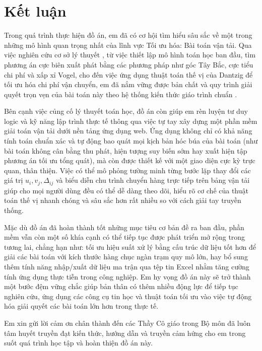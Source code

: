 \documentclass[../main.tex]{subfiles}
\begin{document}
\chapter*{Kết luận}

Trong quá trình thực hiện đồ án, em đã có cơ hội tìm hiểu sâu sắc về một trong những mô hình quan trọng nhất của lĩnh vực Tối ưu hóa: Bài toán vận tải. Qua việc nghiên cứu cơ sở lý thuyết \cite{hitchcock1941, koopmans1949}, từ việc thiết lập mô hình toán học ban đầu, tìm phương án cực biên xuất phát bằng các phương pháp như góc Tây Bắc, cực tiểu chi phí và xấp xỉ Vogel, cho đến việc ứng dụng thuật toán thế vị của Dantzig \cite{dantzig1951} để tối ưu hóa chi phí vận chuyển, em đã nắm vững được bản chất và quy trình giải quyết trọn vẹn của bài toán này theo hệ thống kiến thức giáo trình chuẩn \cite{bachkim}.

Bên cạnh việc củng cố lý thuyết toán học, đồ án còn giúp em rèn luyện tư duy logic và kỹ năng lập trình thực tế thông qua việc tự tay xây dựng một phần mềm giải toán vận tải dưới nền tảng ứng dụng web. Ứng dụng không chỉ có khả năng tính toán chuẩn xác và tự động bao quát mọi kịch bản hóc búa của bài toán (như bài toán không cân bằng thu phát, hiện tượng suy biến sớm hay xuất hiện tập phương án tối ưu tổng quát), mà còn được thiết kế với một giao diện cực kỳ trực quan, thân thiện. Việc có thể mô phỏng tường minh từng bước lặp thay đổi các giá trị $u_i, v_j, \Delta_{ij}$ và biểu diễn chu trình chuyển hàng trực tiếp trên bảng vận tải giúp cho mọi người dùng đều có thể dễ dàng theo dõi, hiểu rõ cơ chế của thuật toán thế vị nhanh chóng và sâu sắc hơn rất nhiều so với cách giải tay truyền thống.

Mặc dù đồ án đã hoàn thành tốt những mục tiêu cơ bản đề ra ban đầu, phần mềm vẫn còn một số khía cạnh có thể tiếp tục được phát triển mở rộng trong tương lai, chẳng hạn như: tối ưu hiệu suất xử lý bằng cấu trúc dữ liệu tốt hơn để giải các bài toán với kích thước hàng chục ngàn trạm quy mô lớn, hay bổ sung thêm tính năng nhập/xuất dữ liệu ma trận qua tệp tin Excel nhằm tăng cường tính ứng dụng thực tiễn trong công nghiệp. Em hy vọng đồ án này sẽ trở thành một bước đệm vững chắc giúp bản thân có thêm nhiều động lực để tiếp tục nghiên cứu, ứng dụng các công cụ tin học và thuật toán tối ưu vào việc tự động hóa giải quyết các bài toán lớn hơn trong thực tế.

Em xin gửi lời cảm ơn chân thành đến các Thầy Cô giáo trong Bộ môn đã luôn tâm huyết truyền đạt kiến thức, hướng dẫn và truyền cảm hứng cho em trong suốt quá trình học tập và hoàn thiện đồ án này.
\end{document}
